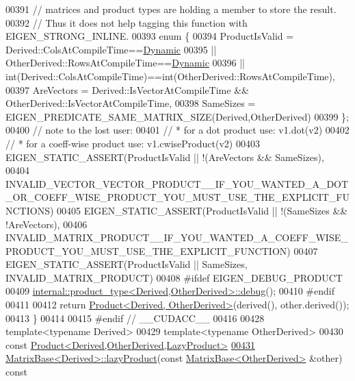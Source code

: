 \begin{DoxyCode}
00391   \textcolor{comment}{// matrices and product types are holding a member to store the result.}
00392   \textcolor{comment}{// Thus it does not help tagging this function with EIGEN\_STRONG\_INLINE.}
00393   \textcolor{keyword}{enum} \{
00394     ProductIsValid =  Derived::ColsAtCompileTime==\hyperlink{namespace_eigen_ad81fa7195215a0ce30017dfac309f0b2}{Dynamic}
00395                    || OtherDerived::RowsAtCompileTime==\hyperlink{namespace_eigen_ad81fa7195215a0ce30017dfac309f0b2}{Dynamic}
00396                    || int(Derived::ColsAtCompileTime)==int(OtherDerived::RowsAtCompileTime),
00397     AreVectors = Derived::IsVectorAtCompileTime && OtherDerived::IsVectorAtCompileTime,
00398     SameSizes = EIGEN\_PREDICATE\_SAME\_MATRIX\_SIZE(Derived,OtherDerived)
00399   \};
00400   \textcolor{comment}{// note to the lost user:}
00401   \textcolor{comment}{//    * for a dot product use: v1.dot(v2)}
00402   \textcolor{comment}{//    * for a coeff-wise product use: v1.cwiseProduct(v2)}
00403   EIGEN\_STATIC\_ASSERT(ProductIsValid || !(AreVectors && SameSizes),
00404     
      INVALID\_VECTOR\_VECTOR\_PRODUCT\_\_IF\_YOU\_WANTED\_A\_DOT\_OR\_COEFF\_WISE\_PRODUCT\_YOU\_MUST\_USE\_THE\_EXPLICIT\_FUNCTIONS)
00405   EIGEN\_STATIC\_ASSERT(ProductIsValid || !(SameSizes && !AreVectors),
00406     INVALID\_MATRIX\_PRODUCT\_\_IF\_YOU\_WANTED\_A\_COEFF\_WISE\_PRODUCT\_YOU\_MUST\_USE\_THE\_EXPLICIT\_FUNCTION)
00407   EIGEN\_STATIC\_ASSERT(ProductIsValid || SameSizes, INVALID\_MATRIX\_PRODUCT)
00408 \textcolor{preprocessor}{#ifdef EIGEN\_DEBUG\_PRODUCT}
00409   \hyperlink{struct_eigen_1_1internal_1_1product__type}{internal::product\_type<Derived,OtherDerived>::debug}();
00410 \textcolor{preprocessor}{#endif}
00411 
00412   \textcolor{keywordflow}{return} \hyperlink{group___core___module_class_eigen_1_1_product}{Product<Derived, OtherDerived>}(derived(), other.derived());
00413 \}
00414 
00415 \textcolor{preprocessor}{#endif // \_\_CUDACC\_\_}
00416 
00428 \textcolor{keyword}{template}<\textcolor{keyword}{typename} Derived>
00429 \textcolor{keyword}{template}<\textcolor{keyword}{typename} OtherDerived>
00430 \textcolor{keyword}{const} \hyperlink{group___core___module_class_eigen_1_1_product}{Product<Derived,OtherDerived,LazyProduct>}
\hyperlink{group___core___module_ae0c280b1066c14ed577021f38876527f}{00431} \hyperlink{group___core___module_class_eigen_1_1_matrix_base}{MatrixBase<Derived>::lazyProduct}(\textcolor{keyword}{const} 
      \hyperlink{group___core___module_class_eigen_1_1_matrix_base}{MatrixBase<OtherDerived>} &other)\textcolor{keyword}{ const}

\end{DoxyCode}
